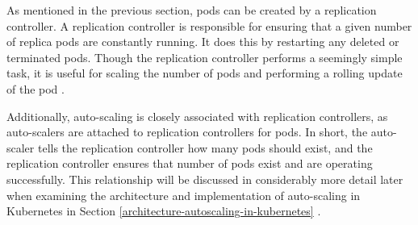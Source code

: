 As mentioned in the previous section, pods can be created by a replication
controller. A replication controller is responsible for ensuring that a given
number of replica pods are constantly running. It does this by restarting any
deleted or terminated pods. Though the replication controller performs a
seemingly simple task, it is useful for scaling the number of pods and
performing a rolling update of the pod \cite{k8s-replication-controllers}.

Additionally, auto-scaling is closely associated with replication controllers, as
auto-scalers are attached to replication controllers for pods. In short, the
auto-scaler tells the replication controller how many pods should exist, and the
replication controller ensures that number of pods exist and are operating
successfully. This relationship will be discussed in considerably more detail later when
examining the architecture and implementation of auto-scaling in Kubernetes in
Section \ref{architecture-autoscaling-in-kubernetes}
\cite{k8s-horizontal-pod-autoscaler-proposal}.
